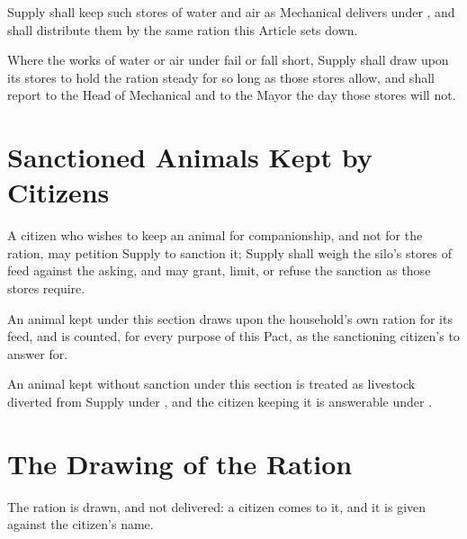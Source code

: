 Supply shall keep such stores of water and air as Mechanical delivers under , and shall distribute them by the same ration this Article sets down.

\begin{clauses}
\item Where the works of water or air under  fail or fall short, Supply shall draw upon its stores to hold the ration steady for so long as those stores allow, and shall report to the Head of Mechanical and to the Mayor the day those stores will not.
\end{clauses}

\section{Sanctioned Animals Kept by Citizens}
\label{sec:supply:sanctioned-animals-kept-by-citizens}

A citizen who wishes to keep an animal for companionship, and not for the ration, may petition Supply to sanction it; Supply shall weigh the silo's stores of feed against the asking, and may grant, limit, or refuse the sanction as those stores require.

\begin{clauses}
\item An animal kept under this section draws upon the household's own ration for its feed, and is counted, for every purpose of this Pact, as the sanctioning citizen's to answer for.
\item An animal kept without sanction under this section is treated as livestock diverted from Supply under , and the citizen keeping it is answerable under .
\end{clauses}

\section{The Drawing of the Ration}
\label{sec:supply:drawing-of-the-ration}

The ration is drawn, and not delivered: a citizen comes to it, and it is given against the citizen's name.

